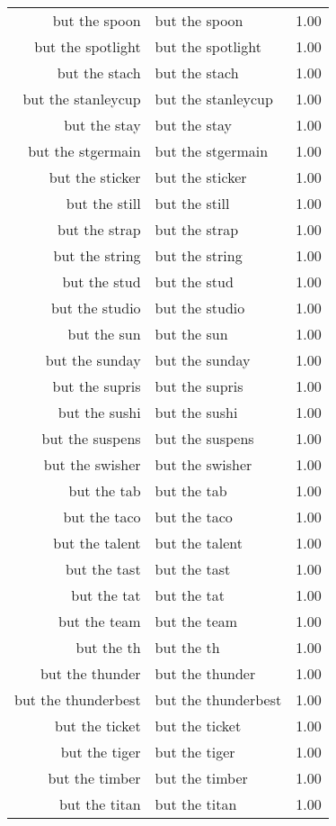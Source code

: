 \begin{table}[ht]
\begin{tabular}{rlr}
  but the spoon & but the spoon & 1.00 \\ 
  but the spotlight & but the spotlight & 1.00 \\ 
  but the stach & but the stach & 1.00 \\ 
  but the stanleycup & but the stanleycup & 1.00 \\ 
  but the stay & but the stay & 1.00 \\ 
  but the stgermain & but the stgermain & 1.00 \\ 
  but the sticker & but the sticker & 1.00 \\ 
  but the still & but the still & 1.00 \\ 
  but the strap & but the strap & 1.00 \\ 
  but the string & but the string & 1.00 \\ 
  but the stud & but the stud & 1.00 \\ 
  but the studio & but the studio & 1.00 \\ 
  but the sun & but the sun & 1.00 \\ 
  but the sunday & but the sunday & 1.00 \\ 
  but the supris & but the supris & 1.00 \\ 
  but the sushi & but the sushi & 1.00 \\ 
  but the suspens & but the suspens & 1.00 \\ 
  but the swisher & but the swisher & 1.00 \\ 
  but the tab & but the tab & 1.00 \\ 
  but the taco & but the taco & 1.00 \\ 
  but the talent & but the talent & 1.00 \\ 
  but the tast & but the tast & 1.00 \\ 
  but the tat & but the tat & 1.00 \\ 
  but the team & but the team & 1.00 \\ 
  but the th & but the th & 1.00 \\ 
  but the thunder & but the thunder & 1.00 \\ 
  but the thunderbest & but the thunderbest & 1.00 \\ 
  but the ticket & but the ticket & 1.00 \\ 
  but the tiger & but the tiger & 1.00 \\ 
  but the timber & but the timber & 1.00 \\ 
  but the titan & but the titan & 1.00 \\ 

\end{tabular}
\end{table}

